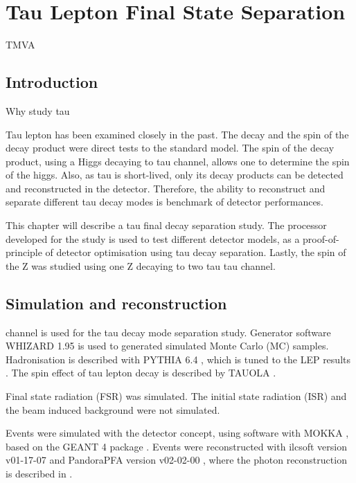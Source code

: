 \chapter{Tau Lepton Final State Separation}
\label{chap:Tau}

%
{TMVA}%


\section{Introduction}

Why study tau

Tau lepton has been examined closely in the past. The decay and the spin of the decay product were direct tests to the standard model. The spin of the decay product, using a Higgs decaying to tau channel, allows one to determine the spin of the higgs. Also, as tau is short-lived, only its decay products can be detected and reconstructed in the detector. Therefore, the ability to reconstruct and separate different tau decay modes is benchmark of detector performances.

This chapter will describe a tau final decay separation study. The processor developed for the study is used to test different detector models, as a proof-of-principle of detector optimisation using tau decay separation. Lastly, the spin of the Z was studied using one Z decaying to two tau tau channel.


\section{Simulation and reconstruction}

\eeToTauTau channel is used for the tau decay mode separation study. Generator software WHIZARD 1.95 \cite{whizard} is used to generated simulated Monte Carlo (MC) samples. Hadronisation is described with PYTHIA 6.4 \cite{Sjostrand:1995iq}, which is tuned to the LEP results \cite{}. The spin effect of tau lepton decay is described by TAUOLA \cite{Jadach:1993hs}.

Final state radiation (FSR) was simulated. The initial state radiation (ISR) and the beam induced background were not simulated.

Events were simulated with the \CLICILD detector concept, using software with MOKKA \cite{MoradeFreitas:2002kj}, based on the GEANT 4 package  \cite{Agostinelli:2002hh}.
Events were reconstructed with  ilcsoft version v01-17-07 \cite{Gaede:82475} and PandoraPFA version v02-02-00 \cite{Marshall:2015rfa}, where the photon reconstruction is described in \cite{Xu:2016rcz}.

